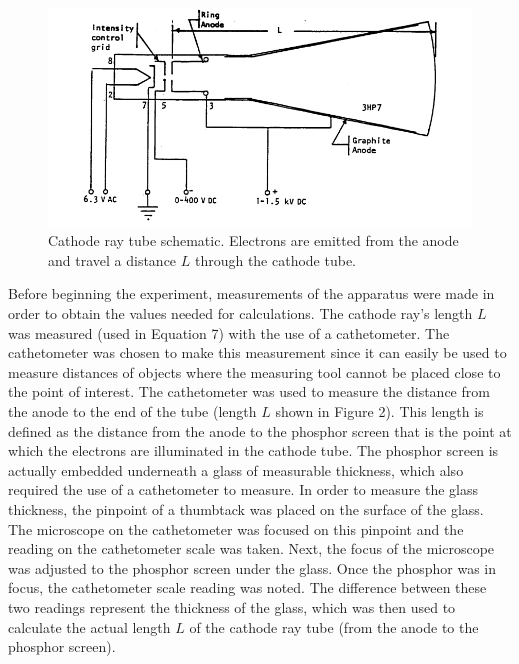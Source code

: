 \documentclass[%
 aip,
 amsmath,amssymb,
 reprint,%
floatfix,
]{revtex4-1}
\begin{document}
	\begin{figure}[H]
		\centering
		\includegraphics[scale=0.5]{cathoderaytube.png}
		\caption{Cathode ray tube schematic. Electrons are emitted from the anode and travel a distance $L$ through the cathode tube.}
	\end{figure}
Before beginning the experiment, measurements of the apparatus were made in order to obtain the values needed for calculations. The cathode ray's length $L$ was measured (used in Equation 7) with the use of a cathetometer. The cathetometer was chosen to make this measurement since it can easily be used to measure distances of objects where the measuring tool cannot be placed close to the point of interest. The cathetometer was used to measure the distance from the anode to the end of the tube (length $L$ shown in Figure 2). This length is defined as the distance from the anode to the phosphor screen that is the point at which the electrons are illuminated in the cathode tube. The phosphor screen is actually embedded underneath a glass of measurable thickness, which also required the use of a cathetometer to measure. In order to measure the glass thickness, the pinpoint of a thumbtack was placed on the surface of the glass. The microscope on the cathetometer was focused on this pinpoint and the reading on the cathetometer scale was taken. Next, the focus of the microscope was adjusted to the phosphor screen under the glass. Once the phosphor was in focus, the cathetometer scale reading was noted. The difference between these two readings represent the thickness of the glass, which was then used to calculate the actual length $L$ of the cathode ray tube (from the anode to the phosphor screen).
\end{document}
